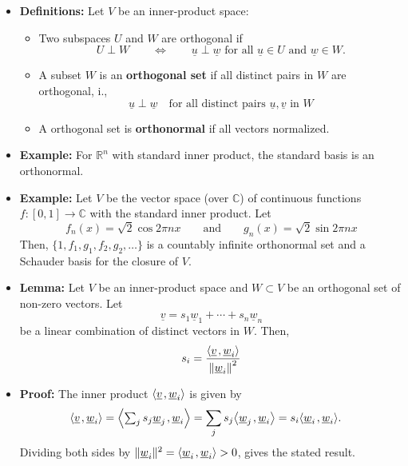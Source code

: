 \documentclass[11pt,twoside]{report}
\newcommand{\bbR}{{\mathbb{R}}}
\newcommand{\bbC}{{\mathbb{C}}}
\newcommand{\vecnot}{\underline}
\newcommand{\inner}[2]{{\left\langle #1 \mskip2mu , #2 \right\rangle}}
\begin{document}
\begin{itemize}
\item \textbf{Definitions:}  Let $V$ be an inner-product space:%
\begin{itemize}
\item Two  subspaces $U$ and $W$  are orthogonal if 
\[
U \perp W \qquad \iff \qquad  \vecnot{u} \perp \vecnot{w} \text{  for all } \vecnot{u}\in U \text{ and } \vecnot{w}\in W. 
 \]


\item  A subset $W$ is an \textbf{orthogonal set} if all distinct pairs in $W$ are orthogonal, i., 
\[
\vecnot{u} \perp \vecnot{w} \quad \text{for all distinct pairs $\vecnot{u}, \vecnot{v}$ in $W$}
\]
\item  A orthogonal set is \textbf{orthonormal} if all vectors normalized. 

\end{itemize} 


\item \textbf{Example:}
For $\bbR^n$ with standard inner product, the standard basis is an orthonormal.



\item \textbf{Example:}
Let $V$ be the vector space (over $\bbC$) of continuous functions $f\colon [0,1]\to\mathbb{C}$ with the standard inner product. Let
\[
f_n(x) = \sqrt{2} \cos 2 \pi n x \qquad \text{and} \qquad g_n (x) = \sqrt{2} \sin 2 \pi n x
\]
Then, $\{ 1, f_1, g_1, f_2, g_2, \ldots \}$ is a countably infinite orthonormal set and a Schauder basis for the closure of $V$.




\item \textbf{Lemma:} 
Let $V$ be an inner-product space and $W\subset V$ be an orthogonal set of non-zero vectors.
Let 
\[
\vecnot{v} = s_1 \vecnot{w}_1 + \cdots + s_n \vecnot{w}_n
\]
be a linear combination of distinct vectors in $W$. Then, 
\[ 
s_i = \frac{ \inner{ \vecnot{v} }{ \vecnot{w}_i } }{ \left\| \vecnot{w}_i \right\|^2 }
\]


\item \textbf{Proof:} 
The inner product $\inner{ \vecnot{v} }{ \vecnot{w}_i }$ is given by 
\begin{equation*}
\begin{split}
\inner{ \vecnot{v} }{ \vecnot{w}_i }
&= \inner{ \textstyle\sum_j s_j \vecnot{w}_j }{ \vecnot{w}_i }
= \sum_j s_j \inner{ \vecnot{w}_j }{ \vecnot{w}_i }
= s_i \inner{ \vecnot{w}_i }{ \vecnot{w}_i } .
\end{split} \vspace{-2.5mm}
\end{equation*}
Dividing both sides by $\| \vecnot{w}_i \|^2 = \inner{ \vecnot{w}_i }{ \vecnot{w}_i } > 0$, gives the stated result.



\end{itemize}
\end{document}
